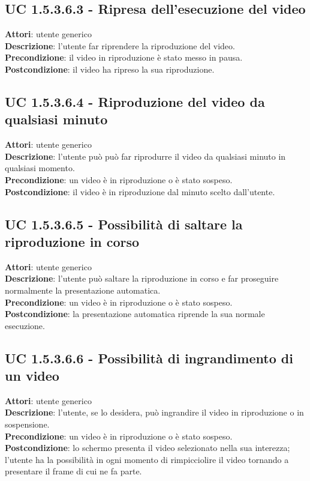 	\subsection{UC 1.5.3.6.3 - Ripresa dell'esecuzione del video}{
		\label{uc1.5.3.6.3}
		\textbf{Attori}: utente generico \\
		\textbf{Descrizione}: l'utente far riprendere la riproduzione del video. \\
		\textbf{Precondizione}: il video in riproduzione è stato messo in pausa.	\\
		\textbf{Postcondizione}: il video ha ripreso la sua riproduzione.	\\
	}
	\subsection{UC 1.5.3.6.4 - Riproduzione del video da qualsiasi minuto}{
		\label{uc1.5.3.6.4}
		\textbf{Attori}: utente generico \\
		\textbf{Descrizione}: l'utente può può far riprodurre il video da qualsiasi minuto in qualsiasi momento. \\
		\textbf{Precondizione}: un video è in riproduzione o è stato sospeso.	\\
		\textbf{Postcondizione}: il video è in riproduzione dal minuto scelto dall'utente.	\\
	}
	\subsection{UC 1.5.3.6.5 - Possibilità di saltare la riproduzione in corso}{
		\label{uc1.5.3.6.5}
		\textbf{Attori}: utente generico \\
		\textbf{Descrizione}: l'utente può saltare la riproduzione in corso e far proseguire normalmente la presentazione automatica. \\
		\textbf{Precondizione}: un video è in riproduzione o è stato sospeso.	\\
		\textbf{Postcondizione}: la presentazione automatica riprende la sua normale esecuzione.	\\
	}
	\subsection{UC 1.5.3.6.6 - Possibilità di ingrandimento di un video}{
		\label{uc1.5.3.6.6}
		\textbf{Attori}: utente generico \\
		\textbf{Descrizione}: l'utente, se lo desidera, può ingrandire il video in riproduzione o in sospensione. \\
		\textbf{Precondizione}: un video è in riproduzione o è stato sospeso.	\\
		\textbf{Postcondizione}: lo schermo presenta il video selezionato nella sua interezza; l'utente ha la possibilità in ogni momento di rimpicciolire il video tornando a presentare il frame di cui ne fa parte.	\\
	}
